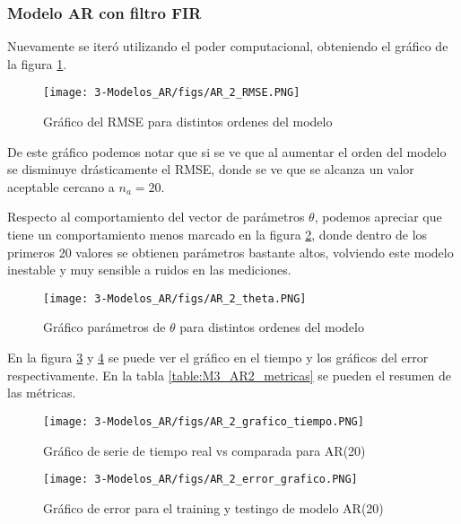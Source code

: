 \subsubsection{Modelo AR con filtro FIR}

Nuevamente se iteró utilizando el poder computacional, obteniendo el gráfico de la figura \ref{fig:M3_AR2_RMSE}.

\begin{figure}[H]
	\centering
	\texttt{[image: 3-Modelos\_AR/figs/AR\_2\_RMSE.PNG]}
	\caption{Gráfico del RMSE para distintos ordenes del modelo}
	\label{fig:M3_AR2_RMSE}
\end{figure}

De este gráfico podemos notar que si se ve que al aumentar el orden del modelo se disminuye drásticamente el RMSE, donde se ve que se alcanza un valor aceptable cercano a $n_a=20$.


Respecto al comportamiento del vector de parámetros $\theta$, podemos apreciar que tiene un comportamiento menos marcado en la figura \ref{fig:M3_AR2_theta}, donde dentro de los primeros 20 valores se obtienen parámetros bastante altos, volviendo este modelo inestable y muy sensible a ruidos en las mediciones.

\begin{figure}[H]
	\centering
	\texttt{[image: 3-Modelos\_AR/figs/AR\_2\_theta.PNG]}
	\caption{Gráfico parámetros de $\theta$ para distintos ordenes del modelo}
	\label{fig:M3_AR2_theta}
\end{figure}

En la figura \ref{fig:M3_AR2_grafico_tiempo} y \ref{fig:M3_AR2_grafico_error} se puede ver el gráfico en el tiempo y los gráficos del error respectivamente. En la tabla \ref{table:M3_AR2_metricas} se pueden el resumen de las métricas.


\begin{figure}[H]
	\centering
	\texttt{[image: 3-Modelos\_AR/figs/AR\_2\_grafico\_tiempo.PNG]}
	\caption{Gráfico de serie de tiempo real vs comparada para AR(20)}
	\label{fig:M3_AR2_grafico_tiempo}
\end{figure}

\begin{figure}[H]
	\centering
	\texttt{[image: 3-Modelos\_AR/figs/AR\_2\_error\_grafico.PNG]}
	\caption{Gráfico de error para el training y testingo de modelo AR(20)}
	\label{fig:M3_AR2_grafico_error}
\end{figure}


